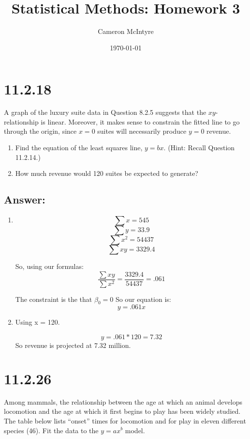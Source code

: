 \documentclass[svgnames]{article}
\title{Statistical Methods: Homework 3}
\author{Cameron McIntyre}
\date{\today}
\begin{document}
\maketitle

\section{11.2.18}
A graph of the luxury suite data in Question 8.2.5 suggests that the $xy$-relationship is linear. Moreover, it makes sense to constrain the fitted line to go through the origin, since $x = 0$ suites will necessarily produce $y = 0$ revenue.

\begin{enumerate}[label = \alph*.]
\item Find the equation of the least squares line, $y = bx$. (Hint: Recall Question 11.2.14.)
\item How much revenue would 120 suites be expected to generate?
\end{enumerate}

\subsection*{Answer:}
\begin{enumerate}[label = \alph*.]
\item
$$\sum x=545$$
$$\sum y=33.9$$
$$\sum x^2=54437$$
$$\sum xy=3329.4$$

So, using our formulas:
$$\frac{\sum xy}{\sum x^2}=\frac{3329.4}{54437}=.061$$

The constraint is the that $\beta_0=0$
So our equation is:
$$y=.061x$$
\item
Using x = 120.

$$y = .061*120 = 7.32$$
So revenue is projected at 7.32 million.
\end{enumerate}

\section{11.2.26}
 Among mammals, the relationship between the age at which an animal develops locomotion and the age at which it first begins to play has been widely studied. The table below lists “onset” times for locomotion and for play in eleven different species (46). Fit the data to the $y = ax^b$ model.
\end{document}
